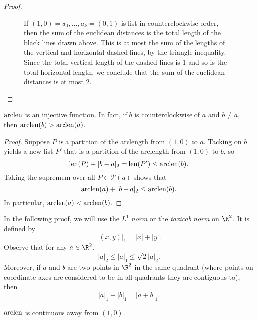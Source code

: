\begin{proof}
\begin{figure}[ht]
\begin{center}
		\end{center}
		\caption{If $(1,0) = a_0, \dotsc, a_k= (0,1)$ is list in counterclockwise order, then the sum of the euclidean distances is the total length of the black lines drawn above. This is at most the sum of the lengths of the vertical and horizontal dashed lines, by the triangle inequality. Since the total vertical length of the dashed lines is 1 and so is the total horizontal length, we conclude that the sum of the euclidean distances is at most $2$.}  \label{arclength-finite-picture}
	\end{figure}
\end{proof}

\begin{lemma} \label{arclen-strictly-increasing}
	$\mathrm{arclen}$ is an injective function. In fact, if $b$ is counterclockwise of $a$ and $b \neq a$, then $\mathrm{arclen}(b) > \mathrm{arclen}(a)$. 
\end{lemma}

\begin{proof}
	Suppose $P$ is a partition of the arclength from $(1,0)$ to $a$. Tacking on $b$ yields a new list $P'$ that is a partition of the arclength from $(1,0)$ to $b$, so
	\[ \mathrm{len}(P) + |b-a|_2 = \mathrm{len}(P') \leq \mathrm{arclen}(b). \]
	Taking the supremum over all $P \in \mathscr{P}(a)$ shows that 
	\[ \mathrm{arclen}(a) + |b-a|_2 \leq \mathrm{arclen}(b). \]
	In particular, $\mathrm{arclen}(a) < \mathrm{arclen}(b)$. 
\end{proof}

\begin{remark} \label{taxicab-norm}
	In the following proof, we will use the \emph{$L^1$ norm} or the \emph{taxicab norm} on $\R^2$. It is defined by 
	\[ |(x,y)|_1 = |x| + |y|. \]
	Observe that for any $a  \in \R^2$,  
	\[ |a|_2 \leq |a|_1 \leq \sqrt{2}|a|_2. \]
	Moreover, if $a$ and $b$ are two points in $\R^2$ in the same quadrant (where points on coordinate axes are considered to be in all quadrants they are contiguous to), then 
	\[ |a|_1 + |b|_1 = |a+b|_1. \]
\end{remark}

\begin{lemma} \label{arclen-continuous}
	$\mathrm{arclen}$ is continuous away from $(1,0)$. 
\end{lemma}

